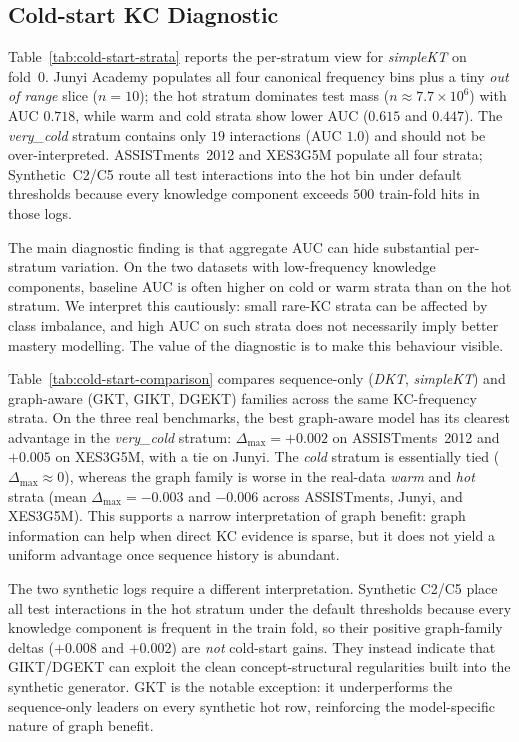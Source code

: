 \documentclass[runningheads]{llncs}
\newcommand{\KC}{knowledge component}
\newcommand{\KCs}{knowledge components}
\begin{document}
\subsection{Cold-start KC Diagnostic}
\label{sec:exp-coldstart}

Table~\ref{tab:cold-start-strata} reports the per-stratum view for
\textit{simpleKT} on fold~0. Junyi Academy populates all four canonical
frequency bins plus a tiny \emph{out of range} slice ($n{=}10$); the
hot stratum dominates test mass ($n{\approx}7.7\times10^6$) with AUC
$0.718$, while warm and cold strata show lower AUC ($0.615$ and
$0.447$). The \emph{very\_cold} stratum contains only $19$ interactions
(AUC $1.0$) and should not be over-interpreted. ASSISTments~2012 and
XES3G5M populate all four strata; Synthetic~C2/C5 route all test
interactions into the hot bin under default thresholds because every
\KC{} exceeds $500$ train-fold hits in those logs.

The main diagnostic finding is that aggregate AUC can hide substantial
per-stratum variation. On the two datasets with low-frequency \KCs{},
baseline AUC is often higher on cold or warm strata than on the hot
stratum. We interpret this cautiously: small rare-KC strata can be
affected by class imbalance, and high AUC on such strata does not
necessarily imply better mastery modelling. The value of the diagnostic
is to make this behaviour visible.


Table~\ref{tab:cold-start-comparison} compares sequence-only
(\textit{DKT}, \textit{simpleKT}) and graph-aware (GKT, GIKT, DGEKT)
families across the same KC-frequency strata. On the three real
benchmarks, the best graph-aware model has its clearest advantage in
the \emph{very\_cold} stratum: $\Delta_{\max}=+0.002$ on
ASSISTments~2012 and $+0.005$ on XES3G5M, with a tie on Junyi. The
\emph{cold} stratum is essentially tied ($\Delta_{\max}\approx0$),
whereas the graph family is worse in the real-data \emph{warm} and
\emph{hot} strata (mean $\Delta_{\max}=-0.003$ and $-0.006$ across
ASSISTments, Junyi, and XES3G5M). This supports a narrow interpretation
of graph benefit: graph information can help when direct KC evidence is
sparse, but it does not yield a uniform advantage once sequence history
is abundant.

The two synthetic logs require a different interpretation. Synthetic
C2/C5 place all test interactions in the hot stratum under the default
thresholds because every \KC{} is frequent in the train fold, so their
positive graph-family deltas ($+0.008$ and $+0.002$) are \emph{not}
cold-start gains. They instead indicate that GIKT/DGEKT can exploit the
clean concept-structural regularities built into the synthetic
generator. GKT is the notable exception: it underperforms the
sequence-only leaders on every synthetic hot row, reinforcing the
model-specific nature of graph benefit.
\end{document}
